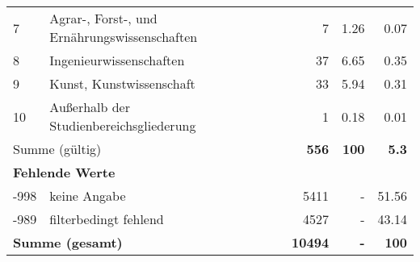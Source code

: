 \begin{longtable}{lXrrr}
     7 &
     \multicolumn{1}{X}{ Agrar-, Forst-, und Ernährungswissenschaften   } &


       \num{7} &
       \num[round-mode=places,round-precision=2]{1.26} &
         \num[round-mode=places,round-precision=2]{0.07} \\

     8 &
     \multicolumn{1}{X}{ Ingenieurwissenschaften   } &


       \num{37} &
       \num[round-mode=places,round-precision=2]{6.65} &
         \num[round-mode=places,round-precision=2]{0.35} \\

     9 &
     \multicolumn{1}{X}{ Kunst, Kunstwissenschaft   } &


       \num{33} &
       \num[round-mode=places,round-precision=2]{5.94} &
         \num[round-mode=places,round-precision=2]{0.31} \\

     10 &
     \multicolumn{1}{X}{ Außerhalb der Studienbereichsgliederung   } &


       \num{1} &
       \num[round-mode=places,round-precision=2]{0.18} &
         \num[round-mode=places,round-precision=2]{0.01} \\
     \midrule
     \multicolumn{2}{l}{Summe (gültig)} &
       \textbf{\num{556}} &
     \textbf{\num{100}} &
       \textbf{\num[round-mode=places,round-precision=2]{5.3}} \\
     \multicolumn{5}{l}{\textbf{Fehlende Werte}}\\
       -998 &
       keine Angabe &
         \num{5411} &
        - &
         \num[round-mode=places,round-precision=2]{51.56} \\
       -989 &
       filterbedingt fehlend &
         \num{4527} &
        - &
         \num[round-mode=places,round-precision=2]{43.14} \\
     \midrule
     \multicolumn{2}{l}{\textbf{Summe (gesamt)}} &
          \textbf{\num{10494}} &
        \textbf{-} &
        \textbf{\num{100}} \\
     \bottomrule
     \end{longtable}
     
